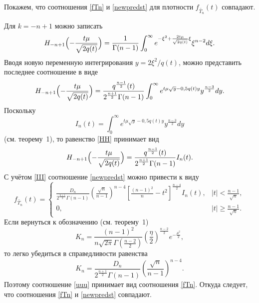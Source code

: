 Покажем, что соотношения
\eqref{fTn} и  \eqref{newpredst}  для плотности $f_{\tilde{T_n}}(t)$ совпадают.

Для $k=-n+1$ можно записать \cite{Leb}
\begin{equation*}
H_{-n+1}\Bigl(-\frac{t\mu}{\sqrt{2q(t)}}\Bigr)=\frac{1}{\Gamma(n-1)}\int_0^{\infty}
e^{-\xi^2+\frac{2t\mu}{\sqrt{2q(t)}}\xi}\xi^{n-2}d\xi.
\end{equation*}
Вводя новую переменную интегрирования
$y={2\xi^2}/{q(t)}$, можно представить последнее соотношение  в виде
\begin{eqnarray}\label{HH}
H_{-n+1}\Bigl(-\frac{t\mu}{\sqrt{2q(t)}}\Bigr)=\frac{q^{\frac{n-1}{2}}(t)}{2^{\frac{n+1}{2}}\Gamma(n-1)}\int_0^{\infty}
e^{t\mu\sqrt{y}-0,5q(t)y}y^{\frac{n-3}{2}}dy.
\end{eqnarray}
Поскольку $$I_n(t)=\int_0^{\infty}
e^{t\mu\sqrt{y}-0,5q(t)y}y^{\frac{n-3}{2}}dy$$  (см. теорему~1), то равенство  \eqref{HH} принимает вид
\begin{equation}\label{III}
H_{-n+1}\Bigl(-\frac{t\mu}{\sqrt{2q(t)}}\Bigr)=\frac{q^{\frac{n-1}{2}}(t)}{2^{\frac{n+1}{2}}\Gamma(n-1)}I_n(t).
\end{equation}
С учётом \eqref{III} соотношение \eqref{newpredst}  можно привести к виду
\begin{equation}\label{uuu}
f_{\tilde{T_n}}(t)=
\left\{
    \begin{array}{cr}
\frac{D_n}{2^{\frac{n+1}{2}}\Gamma(n-1)}\left(\frac{\sqrt{n}}{n-1}\right)^{n-4}
\left[\frac{(n-1)^2}{n}-t^2\right]^{\frac{n-4}{2}}
I_n(t),& |t|<\frac{n-1}{\sqrt{n}},\\
0,& |t|\ge\frac{n-1}{\sqrt{n}}.
\end{array}
\right.
\end{equation}
Если вернуться к обозначению (см. теорему~1)
$$
K_{n}=\frac{(n-1)^2}{n\sqrt{2\pi}\Gamma\left(\frac{n-2}{2}\right)}\left(\frac{\eta}{2}\right)^{\frac{n-2}{2}}e^{-\frac{\mu^2}{2}},
$$ то  легко убедиться  в справедливости равенства
$$K_n=\frac{D_n}{2^{\frac{n+1}{2}}\Gamma(n-1)}\left(\frac{\sqrt{n}}{n-1}\right)^{n-4}.$$
 Поэтому соотношение \eqref{uuu} принимает вид  соотношения \eqref{fTn}.
 Откуда следует, что соотношения \eqref{fTn} и \eqref{newpredst} совпадают.

\smallskip

